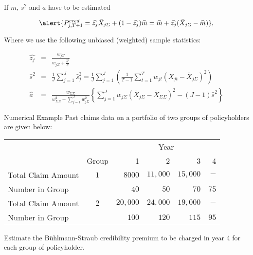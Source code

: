 \documentclass[11pt]{beamer}
\begin{document}
\begin{frame}{If $m$, $s^2$ and $a$ have to be estimated}

$$\alert{P_{j,T+1}^{cred}=\widehat{z_j} \bar{X}_{j\Sigma}+(1-\widehat{z_j})\widehat{m}=\widehat{m}+\widehat{z_j}(\bar{X}_{j\Sigma}-\widehat{m})},$$

Where we use the following unbiased (weighted) sample statistics:

\begin{eqnarray*}
\widehat{z_j}  &=&  \frac{w_{j\Sigma}}{w_{j\Sigma}+\frac{\hat{s}^2}{\hat{a}}} \\
\hat{s}^2 & = & \frac{1}{J} \sum_{j=1}^J \hat{s}_{j}^2 = \frac{1}{J} \sum_{j=1}^J \left(\frac{1}{T-1} \sum_{t=1}^T w_{jt} (X_{jt}-\bar{X}_{j\Sigma})^2\right) \\
\hat{a} & = & \frac{w_{\Sigma\Sigma}}{w_{\Sigma\Sigma}^2-\sum_{j=1}^J w_{j\Sigma}^2} \left\{ \sum_{j=1}^J w_{j\Sigma}(\bar{X}_{j\Sigma}-\bar{X}_{\Sigma\Sigma})^2-(J-1)\hat{s}^2\right\}
\end{eqnarray*}

\end{frame}
\begin{frame}[t]{Numerical Example}
Past claims data on a portfolio of two groups of policyholders are given below:
\begin{center}
\begin{tabular}{lcrrrr}
\hline
&  & \multicolumn{4}{c}{Year} \\
& Group & 1 & 2 & 3 & 4 \\ \hline
Total Claim Amount & $1$ & $8000$ & $11,000$ & $15,000$ & $-$ \\
Number in Group &  & $40$ & $50$ & $70$ & $75$ \\
Total Claim Amount & $2$ & $20,000$ & $24,000$ & $19,000$ & $-$ \\
Number in Group &  & $100$ & $120$ & $115$ & $95$ \\ \hline
\end{tabular}
\end{center}
Estimate the B\"uhlmann-Straub credibility premium to be charged in year 4 for each group of policyholder.
\end{frame}
\begin{frame}


\end{frame}
\begin{frame}


\end{frame}
\begin{frame}


\end{frame}
\end{document}
